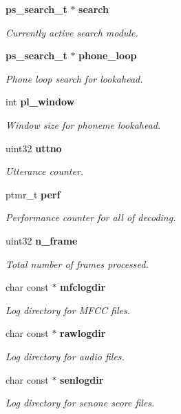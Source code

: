 \begin{DoxyCompactItemize}
{\bf ps\-\_\-search\-\_\-t} $\ast$ {\bf search}
\begin{DoxyCompactList}\small\item\em Currently active search module. \end{DoxyCompactList}\item 
{\bf ps\-\_\-search\-\_\-t} $\ast$ {\bf phone\-\_\-loop}
\begin{DoxyCompactList}\small\item\em Phone loop search for lookahead. \end{DoxyCompactList}\item 
int {\bf pl\-\_\-window}
\begin{DoxyCompactList}\small\item\em Window size for phoneme lookahead. \end{DoxyCompactList}\item 
uint32 {\bf uttno}
\begin{DoxyCompactList}\small\item\em Utterance counter. \end{DoxyCompactList}\item 
ptmr\-\_\-t {\bf perf}
\begin{DoxyCompactList}\small\item\em Performance counter for all of decoding. \end{DoxyCompactList}\item 
uint32 {\bf n\-\_\-frame}
\begin{DoxyCompactList}\small\item\em Total number of frames processed. \end{DoxyCompactList}\item 
char const $\ast$ {\bf mfclogdir}
\begin{DoxyCompactList}\small\item\em Log directory for M\-F\-C\-C files. \end{DoxyCompactList}\item 
char const $\ast$ {\bf rawlogdir}
\begin{DoxyCompactList}\small\item\em Log directory for audio files. \end{DoxyCompactList}\item 
char const $\ast$ {\bf senlogdir}
\begin{DoxyCompactList}\small\item\em Log directory for senone score files. \end{DoxyCompactList}\end{DoxyCompactItemize}


